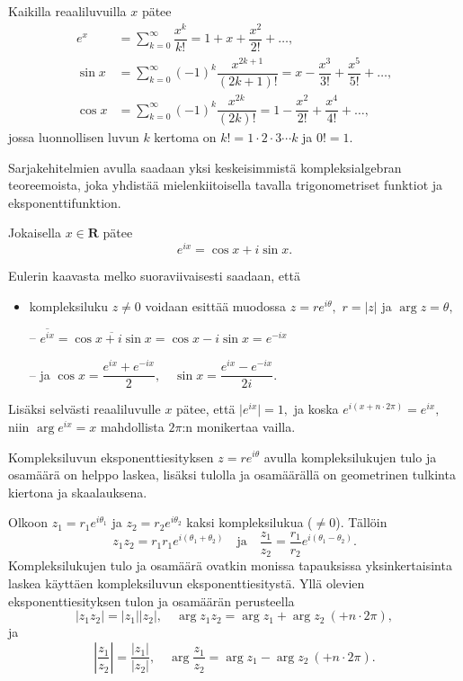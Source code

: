\documentclass[a4paper, 12pt]{article}
\theoremstyle{remark}
\theoremstyle{definition}
\renewcommand{\bar}[1]{\overline{#1}}
\newcommand{\abs}[1]{\lvert#1\rvert}
\begin{document}
\begin{lause} 
Kaikilla reaaliluvuilla $x$ pätee
\begin{align*}
e^x &=\sum_{k=0}^{\infty} \dfrac{x^k}{k!}=1+x+\dfrac{x^2}{2!}+\ldots,\\
\sin x&=\sum_{k=0}^{\infty} (-1)^k\dfrac{x^{2k+1}}{(2k+1)!}=x-\dfrac{x^3}{3!}+\dfrac{x^5}{5!}+\ldots,\\
\cos x&=\sum_{k=0}^{\infty} (-1)^k\dfrac{x^{2k}}{(2k)!}=1-\dfrac{x^2}{2!}+\dfrac{x^4}{4!}+\ldots,
\end{align*}
jossa luonnollisen luvun $k$ kertoma on $k!=1\cdot 2\cdot 3 \cdots k$ ja $0!=1.$
\end{lause}

Sarjakehitelmien avulla saadaan yksi keskeisimmistä kompleksialgebran teoreemoista, joka yhdistää mielenkiitoisella tavalla trigonometriset funktiot ja eksponenttifunktion.

\begin{lause} Jokaisella $x\in\mathbf{R}$ pätee
$$
e^{ix}=\cos x +i\sin x.
$$
\end{lause}

\begin{seur}
Eulerin kaavasta melko suoraviivaisesti saadaan, että 
\begin{itemize}[label=--, leftmargin=*]
\item kompleksiluku $z\neq 0$ voidaan esittää muodossa $z=re^{i\theta},$ $r=\abs{z}$ ja $\arg{z}=\theta,$
\item[--] $\bar{e^{ix}}=\bar{\cos x +i\sin x}=\cos x -i\sin x=e^{-ix}$
\item[--] ja $\displaystyle
\cos x=\dfrac{e^{ix}+e^{-ix}}{2},\quad \sin x=\dfrac{e^{ix}-e^{-ix}}{2i}.
$
\end{itemize}
Lisäksi selvästi reaaliluvulle $x$ pätee, että $\abs{e^{ix}}=1,$ ja koska $e^{i(x+n\cdot 2\pi)}=e^{ix},$ niin $\arg e^{ix}=x$ mahdollista $2\pi$:n monikertaa vailla.
\end{seur}

Kompleksiluvun eksponenttiesityksen $z=re^{i\theta}$ avulla kompleksilukujen tulo ja osamäärä on helppo laskea, lisäksi tulolla ja osamäärällä on geometrinen tulkinta kiertona ja skaalauksena.
\begin{lause} Olkoon $z_1=r_1e^{i\theta_1}$ ja $z_2=r_2 e^{i\theta_2}$ kaksi kompleksilukua ($\neq 0$). Tällöin
$$
z_1z_2=r_1r_1 e^{i(\theta_1+\theta_2)}\quad\text{ja}\quad \frac{z_1}{z_2}=\frac{r_1}{r_2}e^{i(\theta_1-\theta_2)}.
$$
Kompleksilukujen tulo ja osamäärä ovatkin monissa tapauksissa yksinkertaisinta laskea käyttäen kompleksiluvun eksponenttiesitystä. Yllä olevien eksponenttiesityksen tulon ja osamäärän perusteella
$$
\abs{z_1z_2}=\abs{z_1}\abs{z_2},\quad \arg{z_1z_2}=\arg z_1+\arg z_2 \ (+n\cdot 2\pi),
$$
ja
$$
\left|\frac{z_1}{z_2}\right|=\frac{\abs{z_1}}{\abs{z_2}},\quad \arg{\frac{z_1}{z_2}}=\arg z_1-\arg z_2 \ (+n\cdot 2\pi).
$$
\end{lause}
\end{document}
